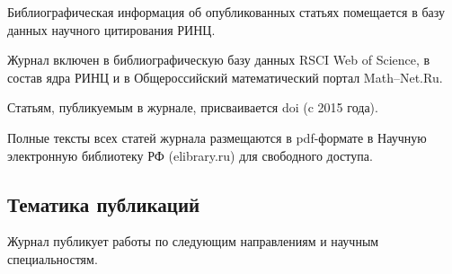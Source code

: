 \documentclass[10pt,a4paper]{book}
\begin{document}
Библиографическая информация об опубликованных статьях помещается в базу данных научного
цитирования РИНЦ. 

Журнал включен в библиографическую базу данных RSCI Web of Science, в состав
ядра РИНЦ и в Общероссийский математический портал Math--Net.Ru.

Статьям, публикуемым в журнале, присваивается doi (c 2015 года).

Полные тексты всех статей журнала размещаются в pdf-формате в Научную электронную
библиотеку РФ (elibrary.ru) для свободного доступа.


\subsection{Тематика публикаций}
Журнал публикует работы по следующим направлениям и научным специальностям.
\end{document}
